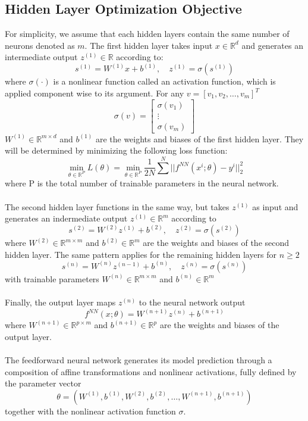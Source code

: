 \documentclass[11pt]{article}
\newcommand{\R}{\mathbb{R}}
\begin{document}
\subsection*{Hidden Layer Optimization Objective}
For simplicity, we assume that each hidden layers contain the same number of neurons denoted as $m$. The first hidden layer takes input $x \in \R^d$ and generates an intermediate output $z^{(1)} \in \R$ according to:
\[
s^{(1)} = W^{(1)} x + b^{(1)}, \quad z^{(1)} = \sigma(s^{(1)})
\]
where $\sigma(\cdot)$ is a nonlinear function called an activation function, which is applied component wise to its argument. For any $v  = [v_1, v_2,\dots,v_m]^T$
\[
\sigma(v) = \begin{bmatrix}
    \sigma(v_1) \\ \vdots \ \\ \sigma(v_m)
\end{bmatrix}
\]
$W^{(1)} \in \R^{m\times d}$ and $b^{(1)}$ are the weights and biases of the first hidden layer. They will be determined by minimizing the following loss function: 
\[
\min_{\theta \in \R^P} L(\theta) = \min_{\theta \in \R^P} \frac{1}{2N} \sum^N||f^{NN}(x^i;\theta)-y^i||^2_2
\]
where P is the total number of trainable parameters in the neural network.
\\
\\
The second hidden layer functions in the same way, but takes $z^{(1)}$ as input and generates an indermediate output $z^{(1)} \in \R^m$ according to 
\[
s^{(2)} = W^{(2)} z^{(1)} + b^{(2)}, \quad z^{(2)} = \sigma(s^{(2)})
\]
where $W^{(2)} \in \R^{m\times m}$ and $b^{(2)} \in \R^m$ are the weights and biases of the second hidden layer. The same pattern applies for the remaining hidden layers for $n \geq 2$
\[
s^{(n)} = W^{(n)} z^{(n-1)} + b^{(n)}, \quad z^{(n)} = \sigma(s^{(n)})
\]
with trainable parameters  $W^{(n)} \in \R^{m\times m}$ and $b^{(n)} \in \R^m$ 
\\
\\
Finally, the output layer maps $z^{(n)}$ to the neural network output
\[
f^{NN}(x;\theta) = W^{(n+1)}z^{(n)} + b^{(n+1)}
\]
where $W^{(n+1)} \in \R^{p \times m}$ and $b^{(n+1)} \in \R^{p}$ are the weights and biases of the output layer. 
\\
\\
The feedforward neural network generates its model prediction through a composition of affine transformations and nonlinear activations, fully defined by the parameter vector 
\[
\theta = (W^{(1)}, b^{(1)},W^{(2)}, b^{(2)},\dots,W^{(n+1)}, b^{(n+1)})
\]
together with the nonlinear activation function $\sigma$. 
\end{document}
